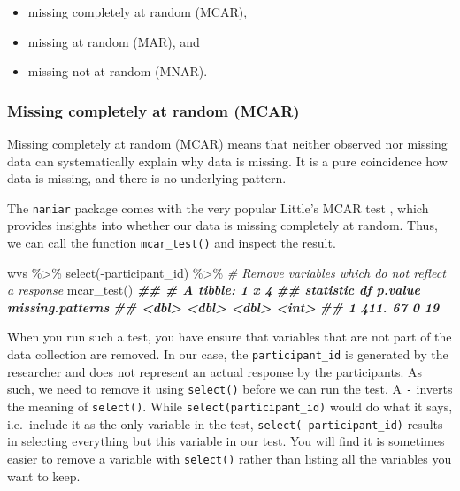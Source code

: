 \documentclass[
]{book}
\newenvironment{Shaded}{\begin{snugshade}}{\end{snugshade}}
\newcommand{\CommentTok}[1]{\textcolor[rgb]{0.56,0.35,0.01}{\textit{#1}}}
\newcommand{\DocumentationTok}[1]{\textcolor[rgb]{0.56,0.35,0.01}{\textbf{\textit{#1}}}}
\newcommand{\FunctionTok}[1]{\textcolor[rgb]{0.00,0.00,0.00}{#1}}
\newcommand{\NormalTok}[1]{#1}
\newcommand{\SpecialCharTok}[1]{\textcolor[rgb]{0.00,0.00,0.00}{#1}}
\begin{document}
\begin{itemize}
\item
  missing completely at random (MCAR),
\item
  missing at random (MAR), and
\item
  missing not at random (MNAR). \citep{rubin-1976}
\end{itemize}

\hypertarget{missing-completetly-at-random-mcar}{%
\subsubsection{Missing completely at random (MCAR)}\label{missing-completetly-at-random-mcar}}

Missing completely at random (MCAR) means that neither observed nor missing data can systematically explain why data is missing. It is a pure coincidence how data is missing, and there is no underlying pattern.

The \texttt{naniar} package comes with the very popular Little's MCAR test \citep{little-1988}, which provides insights into whether our data is missing completely at random. Thus, we can call the function \texttt{mcar\_test()} and inspect the result.

\begin{Shaded}
\begin{Highlighting}[]
\NormalTok{wvs }\SpecialCharTok{\%\textgreater{}\%}
  \FunctionTok{select}\NormalTok{(}\SpecialCharTok{{-}}\NormalTok{participant\_id) }\SpecialCharTok{\%\textgreater{}\%}     \CommentTok{\# Remove variables which do not reflect a response}
  \FunctionTok{mcar\_test}\NormalTok{()}
\DocumentationTok{\#\# \# A tibble: 1 x 4}
\DocumentationTok{\#\#   statistic    df p.value missing.patterns}
\DocumentationTok{\#\#       \textless{}dbl\textgreater{} \textless{}dbl\textgreater{}   \textless{}dbl\textgreater{}            \textless{}int\textgreater{}}
\DocumentationTok{\#\# 1      411.    67       0               19}
\end{Highlighting}
\end{Shaded}

When you run such a test, you have ensure that variables that are not part of the data collection are removed. In our case, the \texttt{participant\_id} is generated by the researcher and does not represent an actual response by the participants. As such, we need to remove it using \texttt{select()} before we can run the test. A \texttt{-} inverts the meaning of \texttt{select()}. While \texttt{select(participant\_id)} would do what it says, i.e.~include it as the only variable in the test, \texttt{select(-participant\_id)} results in selecting everything but this variable in our test. You will find it is sometimes easier to remove a variable with \texttt{select()} rather than listing all the variables you want to keep.
\end{document}
